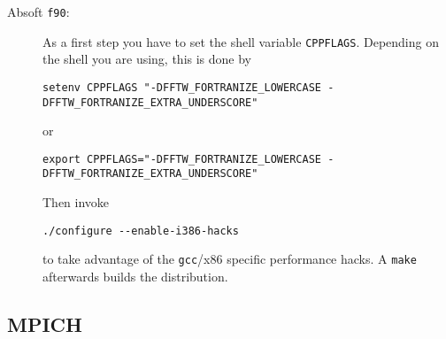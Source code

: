 \documentclass[a4paper,10pt]{article}
\begin{document}
\begin{description}
\item[Absoft \texttt{f90}:] As a first step you have to set the shell variable
\texttt{CPPFLAGS}. Depending on the shell you are using, this is done by
{\footnotesize
\begin{verbatim}
setenv CPPFLAGS "-DFFTW_FORTRANIZE_LOWERCASE -DFFTW_FORTRANIZE_EXTRA_UNDERSCORE"
\end{verbatim}
}
or
{\footnotesize
\begin{verbatim}
export CPPFLAGS="-DFFTW_FORTRANIZE_LOWERCASE -DFFTW_FORTRANIZE_EXTRA_UNDERSCORE"
\end{verbatim}
}
Then invoke
\begin{verbatim}
./configure --enable-i386-hacks
\end{verbatim}
to take advantage of the \texttt{gcc}/x86 specific performance hacks. A \texttt{make} afterwards builds the distribution.


\end{description}

\subsection{MPICH}
\end{document}
